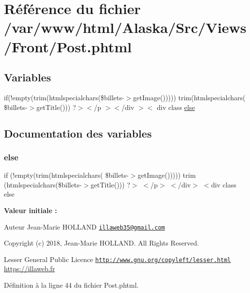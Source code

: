 \hypertarget{_post_8phtml}{}\section{Référence du fichier /var/www/html/\+Alaska/\+Src/\+Views/\+Front/\+Post.phtml}
\label{_post_8phtml}
\subsection*{Variables}
\begin{DoxyCompactItemize}
\item 
if(!empty(trim(htmlspecialchars(\$billets-\/$>$get\+Image())))) trim(htmlspecialchars( \$billets-\/$>$get\+Title())) ?$>$$<$/p $>$$<$/div $>$$<$ div class \hyperlink{_post_8phtml_aac228b0e8b0c735747754b789e95709c}{else}
\end{DoxyCompactItemize}


\subsection{Documentation des variables}
\mbox{\label{_post_8phtml_aac228b0e8b0c735747754b789e95709c}} 
\subsubsection{\texorpdfstring{else}{else}}
{\footnotesize\ttfamily if (!empty(trim(htmlspecialchars( \$billets-\/$>$get\+Image())))) trim (htmlspecialchars(\$billets-\/$>$get\+Title())) ?$>$ $<$/p$>$ $<$/div$>$ $<$div class else}

{\bfseries Valeur initiale \+:}
\begin{DoxyAuthor}{Auteur}
Jean-\/\+Marie H\+O\+L\+L\+A\+ND \href{mailto:illaweb35@gmail.com}{\tt illaweb35@gmail.\+com} 
\end{DoxyAuthor}
\begin{DoxyCopyright}{Copyright}
(c) 2018, Jean-\/\+Marie H\+O\+L\+L\+A\+ND. All Rights Reserved.
\end{DoxyCopyright}
Lesser General Public Licence \href{http://www.gnu.org/copyleft/lesser.html}{\tt http\+://www.\+gnu.\+org/copyleft/lesser.\+html} \hyperlink{}{https\+://illaweb.\+fr}

Définition à la ligne 44 du fichier Post.\+phtml.

